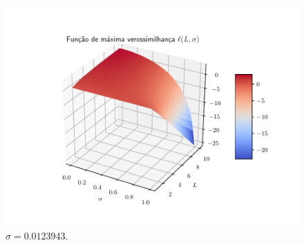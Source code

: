 \documentclass[journal,article,submit,moreauthors,pdftex]{Definitions/mdpi}
\begin{document}
\begin{figure}[hbt]
  	\caption{$\sigma=0.0047520 $.}\label{cap_acf_fig04}
\endminipage\hfill
{}

  \includegraphics[width=\linewidth]{funv_max_ver_j_40_flev_produto.pdf}
		\caption{$\sigma= 0.0123943$.}\label{cap_acf_fig05}
\endminipage\hfill
\end{figure}
\end{document}
